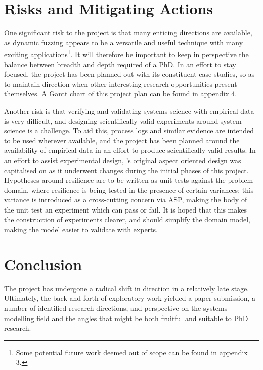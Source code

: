 \documentclass{article}
\begin{document}
\section{Risks and Mitigating Actions}
\label{sec:research_risks}
One significant risk to the project is that many enticing directions are
available, as dynamic fuzzing appears to be a versatile and useful technique
with many exciting applications\footnote{Some potential future work deemed out
  of scope can be found in appendix 3.}. It will therefore be important to keep
in perspective the balance between breadth and depth required of a PhD. In an
effort to stay focused, the project has been planned out with its constituent
case studies, so as to maintain direction when other interesting research
opportunities present themselves. A Gantt chart of this project plan can be
found in appendix 4.\par

Another risk is that verifying and validating systems science with empirical
data is very difficult, and designing scientifically valid experiments around
system science is a challenge. To aid this, process logs and similar evidence
are intended to be used wherever available, and the project has been planned
around the availability of empirical data in an effort to produce scientifically
valid results. In an effort to assist experimental design, \pdsf{}'s original
aspect oriented design was capitalised on as it underwent changes during the
initial phases of this project. Hypotheses around resilience are to be written
as unit tests against the problem domain, where resilience is being tested in
the presence of certain variances; this variance is introduced as a
cross-cutting concern via ASP, making the body of the unit test an experiment
which can pass or fail. It is hoped that this makes the construction of
experiments clearer, and should simplify the domain model\cite{caise_forum_18},
making the model easier to validate with experts.\par



\section{Conclusion}
\label{sec:concluion}

The project has undergone a radical shift in direction in a relatively late
stage. Ultimately, the back-and-forth of exploratory work yielded a paper
submission\cite{realx_paper}, a number of identified research directions, and
perspective on the systems modelling field and the angles that
might be both fruitful and suitable to PhD research.\par
\end{document}
